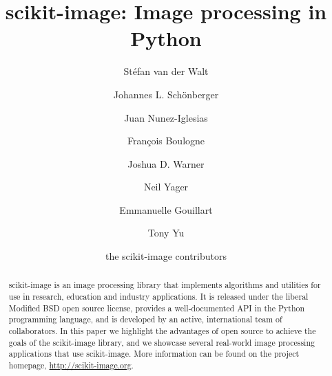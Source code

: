 \documentclass[fleqn,12pt]{wlpeerj}
\begin{document}
\title{scikit-image: Image processing in Python}

\author[1,2]{Stéfan van der Walt}
\author[3]{Johannes L. Schönberger}
\author[4]{Juan Nunez-Iglesias}
\author[5]{François Boulogne}
\author[6]{Joshua D. Warner}
\author[7]{Neil Yager}
\author[8]{Emmanuelle Gouillart}
\author[9]{Tony Yu}
\author[10]{the scikit-image contributors}



\begin{abstract}
  scikit-image is an image processing library that implements algorithms and utilities for use in research, education and industry applications. It is released under the liberal Modified BSD open source license, provides a well-documented API in the Python programming language, and is developed by an active, international team of collaborators. In this paper we highlight the advantages of open source to achieve the goals of the scikit-image library, and we showcase several real-world image processing applications that use scikit-image. More information can be found on the project homepage, \url{http://scikit-image.org}.
\end{abstract}

\flushbottom
\maketitle
\thispagestyle{empty}

\end{document}
